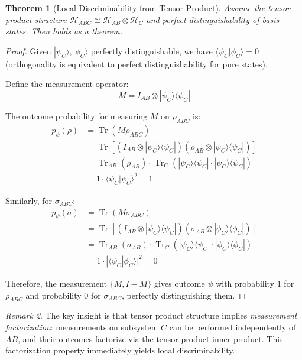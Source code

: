 \documentclass[11pt,a4paper]{article}
\newtheorem{theorem}{Theorem}[section]
\theoremstyle{definition}
\theoremstyle{remark}
\newtheorem{remark}[theorem]{Remark}
\DeclareMathOperator{\Tr}{Tr}
\newcommand{\Hilb}{\mathcal{H}}
\newcommand{\ket}[1]{|#1\rangle}
\newcommand{\braket}[2]{\langle#1|#2\rangle}
\newcommand{\ketbra}[2]{|#1\rangle\langle#2|}
\newcommand{\abs}[1]{|#1|}
\begin{document}
\begin{theorem}[Local Discriminability from Tensor Product]
\label{thm:ld_from_tensor}
Assume the tensor product structure $\Hilb_{ABC} \cong \Hilb_{AB} \otimes \Hilb_C$ and perfect distinguishability of basis states. Then  holds as a theorem.
\end{theorem}

\begin{proof}
Given $\ket{\psi_C}, \ket{\phi_C}$ perfectly distinguishable, we have $\braket{\psi_C}{\phi_C} = 0$ (orthogonality is equivalent to perfect distinguishability for pure states).

Define the measurement operator:
\begin{equation}
M = I_{AB} \otimes \ketbra{\psi_C}{\psi_C}
\end{equation}

The outcome probability for measuring $M$ on $\rho_{ABC}$ is:
\begin{align}
p_\psi(\rho) &= \Tr(M \rho_{ABC}) \\
&= \Tr[(I_{AB} \otimes \ketbra{\psi_C}{\psi_C})(\rho_{AB} \otimes \ketbra{\psi_C}{\psi_C})] \\
&= \Tr_{AB}(\rho_{AB}) \cdot \Tr_C(\ketbra{\psi_C}{\psi_C} \cdot \ketbra{\psi_C}{\psi_C}) \\
&= 1 \cdot \braket{\psi_C}{\psi_C}^2 = 1
\end{align}

Similarly, for $\sigma_{ABC}$:
\begin{align}
p_\psi(\sigma) &= \Tr(M \sigma_{ABC}) \\
&= \Tr[(I_{AB} \otimes \ketbra{\psi_C}{\psi_C})(\sigma_{AB} \otimes \ketbra{\phi_C}{\phi_C})] \\
&= \Tr_{AB}(\sigma_{AB}) \cdot \Tr_C(\ketbra{\psi_C}{\psi_C} \cdot \ketbra{\phi_C}{\phi_C}) \\
&= 1 \cdot \abs{\braket{\psi_C}{\phi_C}}^2 = 0
\end{align}

Therefore, the measurement $\{M, I - M\}$ gives outcome $\psi$ with probability $1$ for $\rho_{ABC}$ and probability $0$ for $\sigma_{ABC}$, perfectly distinguishing them.
\end{proof}

\begin{remark}
The key insight is that tensor product structure implies \textit{measurement factorization}: measurements on subsystem $C$ can be performed independently of $AB$, and their outcomes factorize via the tensor product inner product. This factorization property immediately yields local discriminability.
\end{remark}
\end{document}
